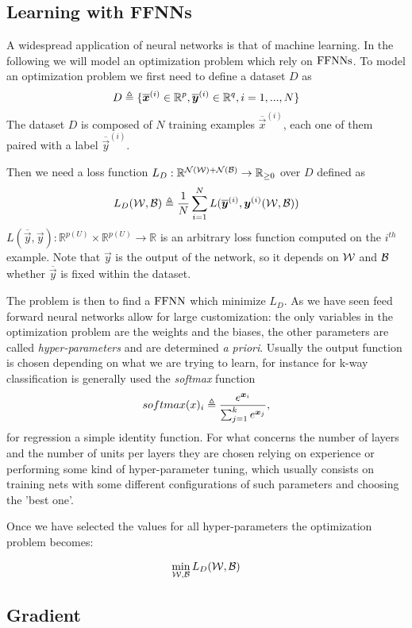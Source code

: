 \subsection{Learning with FFNNs}
A widespread application of neural networks is that of machine learning. In the following we will model an optimization problem which rely on $\mathrm{FFNNs}$.
To model an optimization problem we first need to define a dataset $D$ as 
\begin{equation}
D\triangleq\{\overline{\boldsymbol{x}}^{(i)} \in \mathbb{R}^p, \overline{\boldsymbol{y}}^{(i)} \in \mathbb{R}^q,  i=1,...,N\}
\end{equation}
The dataset $D$ is composed of $N$ training examples $\overline{\vec{x}}^{(i)}$, each one of them paired with a label $\overline{\vec{y}}^{(i)}$.

Then we need a loss function $L_D:\mathbb{R}^{\mathcal{N}(\mathcal{W})+\mathcal{N}(\mathcal{B})} \rightarrow \mathbb{R}_{\geq 0}$ over $D$ defined as
\begin{equation}
L_D(\mathcal{W},\mathcal{B})\triangleq\frac{1}{N}\sum_{i=1}^N L(\overline{\boldsymbol{y}}^{(i)},\boldsymbol{y}^{(i)}(\mathcal{W},\mathcal{B})) 
\end{equation}
$L(\overline{\vec{y}},\vec{y}):\mathbb{R}^{p(U)} \times \mathbb{R}^{p(U)} \rightarrow \mathbb{R}$ is an arbitrary loss function computed on the $i^{th}$ example. Note that $\vec{y}$ is the output of the
network, so it depends on $\mathcal{W}$ and $\mathcal{B}$ whether $\overline{\vec{y}}$ is fixed within the dataset.


The problem is then to find a $\mathrm{FFNN}$ which minimize $L_D$. As we have seen feed forward neural networks allow for large customization: the only variables in the optimization problem are the weights
and the biases, the other
parameters are called \textit{hyper-parameters} and are determined \textit{a priori}. Usually the output function is chosen depending on what we are trying to learn, for instance for k-way classification
is generally used the \textit{softmax} function \begin{equation}
softmax(x)_i\triangleq \frac{e^{\boldsymbol{x}_i}}{\sum_{j=1}^k e^{\boldsymbol{x}_j} },
\end{equation} for regression a simple identity function.
For what concerns the number of layers and the number of units per layers they are chosen relying on experience or performing some kind of hyper-parameter tuning, which usually consists on training nets
with some different configurations of such parameters and choosing the 'best one'.

Once we have selected the values for all hyper-parameters the optimization problem becomes:

\begin{equation}
\min_{\mathcal{W},\mathcal{B}} L_D(\mathcal{W},\mathcal{B}) \\
\end{equation}


\subsection{Gradient}


